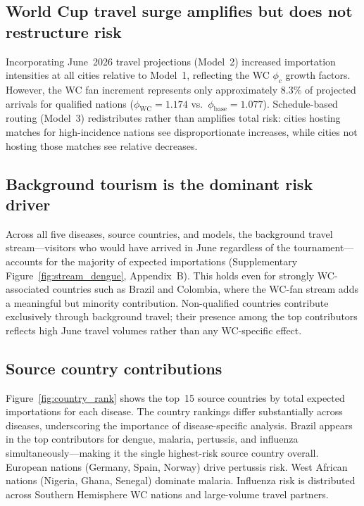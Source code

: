 \documentclass[12pt]{article}
\begin{document}
\subsection*{World Cup travel surge amplifies but does not restructure risk}

Incorporating June~2026 travel projections (Model~2) increased
importation intensities at all cities relative to Model~1, reflecting
the WC $\phi_c$ growth factors. However, the WC fan increment
represents only approximately 8.3\% of projected arrivals for
qualified nations ($\phi_\text{WC}=1.174$ vs.\
$\phi_\text{base}=1.077$). Schedule-based routing (Model~3)
redistributes rather than amplifies total risk: cities hosting
matches for high-incidence nations see disproportionate increases,
while cities not hosting those matches see relative decreases.

\subsection*{Background tourism is the dominant risk driver}

Across all five diseases, source countries, and models, the background
travel stream---visitors who would have arrived in June regardless of
the tournament---accounts for the majority of expected importations
(Supplementary Figure~\ref{fig:stream_dengue}, Appendix~B). This
holds even for strongly WC-associated countries such as Brazil and
Colombia, where the WC-fan stream adds a meaningful but minority
contribution. Non-qualified
countries contribute exclusively through background travel; their
presence among the top contributors reflects high June travel volumes
rather than any WC-specific effect.

\subsection*{Source country contributions}

Figure~\ref{fig:country_rank} shows the top~15 source countries by
total expected importations for each disease. The country rankings
differ substantially across diseases, underscoring the importance of
disease-specific analysis. Brazil appears in the top contributors for
dengue, malaria, pertussis, and influenza simultaneously---making it
the single highest-risk source country overall. European nations
(Germany, Spain, Norway) drive pertussis risk. West African nations
(Nigeria, Ghana, Senegal) dominate malaria. Influenza risk is
distributed across Southern Hemisphere WC nations and large-volume
travel partners.
\end{document}
